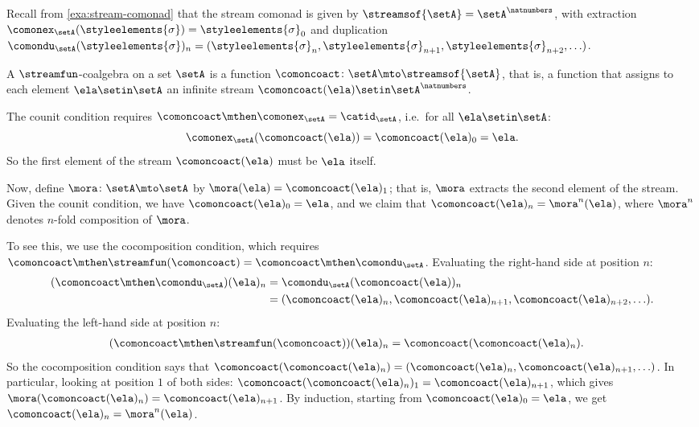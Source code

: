 \begin{example}
\label{exa:coalgebra-stream-comonad}

Recall from \cref{exa:stream-comonad} that the stream comonad is given by $\streamsof{\setA} = \setA^{\natnumbers}$, with extraction $\comonex_\setA(\styleelements{\sigma}) = \styleelements{\sigma}_0$ and duplication $\comondu_\setA(\styleelements{\sigma})_n = (\styleelements{\sigma}_n, \styleelements{\sigma}_{n+1}, \styleelements{\sigma}_{n+2}, \ldots)$.

A $\streamfun$-coalgebra on a set $\setA$ is a function $\comoncoact \colon \setA \mto \streamsof{\setA}$, that is, a function that assigns to each element $\ela \setin \setA$ an infinite stream $\comoncoact(\ela) \setin \setA^{\natnumbers}$.

The counit condition requires $\comoncoact \mthen \comonex_\setA = \catid_\setA$, i.e.\ for all $\ela \setin \setA$:
\begin{equation*}
    \comonex_\setA(\comoncoact(\ela)) = \comoncoact(\ela)_0 = \ela.
\end{equation*}
So the first element of the stream $\comoncoact(\ela)$ must be $\ela$ itself.

Now, define $\mora \colon \setA \mto \setA$ by $\mora(\ela) = \comoncoact(\ela)_1$; that is, $\mora$ extracts the second element of the stream. Given the counit condition, we have $\comoncoact(\ela)_0 = \ela$, and we claim that $\comoncoact(\ela)_n = \mora^n(\ela)$, where $\mora^n$ denotes $n$-fold composition of $\mora$.

To see this, we use the cocomposition condition, which requires $\comoncoact \mthen \streamfun(\comoncoact) = \comoncoact \mthen \comondu_\setA$.
Evaluating the right-hand side at position $n$:
\begin{align*}
(\comoncoact \mthen \comondu_\setA)(\ela)_n
& = \comondu_\setA(\comoncoact(\ela))_n \\
& = (\comoncoact(\ela)_n, \comoncoact(\ela)_{n+1}, \comoncoact(\ela)_{n+2}, \ldots).
\end{align*}
Evaluating the left-hand side at position $n$:
\begin{align*}
(\comoncoact \mthen \streamfun(\comoncoact))(\ela)_n
& = \comoncoact(\comoncoact(\ela)_n).
\end{align*}
So the cocomposition condition says that $\comoncoact(\comoncoact(\ela)_n) = (\comoncoact(\ela)_n, \comoncoact(\ela)_{n+1}, \ldots)$. In particular, looking at position $1$ of both sides: $\comoncoact(\comoncoact(\ela)_n)_1 = \comoncoact(\ela)_{n+1}$, which gives $\mora(\comoncoact(\ela)_n) = \comoncoact(\ela)_{n+1}$. By induction, starting from $\comoncoact(\ela)_0 = \ela$, we get $\comoncoact(\ela)_n = \mora^n(\ela)$.


\end{example}
